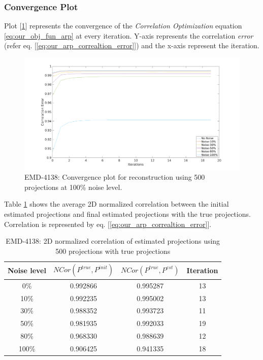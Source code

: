 \documentclass{report}
\begin{document}
\subsubsection{Convergence Plot}
Plot [\ref{figplot:emd_4138_result_Bm3d_convergence}] represents the convergence of the \textit{Correlation Optimization} equation \ref{eq:our_obj_fun_arp} at every iteration. Y-axis represents the correlation \textit{error} (refer eq. [\ref{eq:our_arp_correaltion_error}]) and the x-axis represent the iteration.

\begin{figure}[H]
\includegraphics[width=1\textwidth]{emd_4138_result_Bm3d_convergence.png}
\centering
\captionsetup{justification=centering}
\caption{EMD-4138: Convergence plot for reconstruction using 500 projections at 100\% noise level. }
\label{figplot:emd_4138_result_Bm3d_convergence}
\end{figure}

Table \ref{tbl:our_arp_4138_result-2d-correlation} shows the average 2D normalized correlation between the initial estimated projections and final estimated projections with the true projections. Correlation is represented by eq. [\ref{eq:our_arp_correaltion_error}]. 
\begin{table}[H]
    \centering
     \begin{tabular}{||c c c c ||} 
             \hline
             Noise level & $ NCor(P^{true},P^{init})$  &   $ NCor(P^{true},P^{est})$ &  Iteration \\
             \hline\hline
             0\% & 0.992866  & 0.995287 & 13 \\
            \hline
            10\% & 0.992235  & 0.995002 & 13 \\
            \hline
            30\% &0.988352  & 0.993723 & 11  \\
            \hline
            50\% &0.981935  & 0.992033 & 19 \\ 
            \hline
            80\% &0.968330  & 0.988639 & 12 \\
            \hline
            100\% &0.906425  & 0.941335 & 18 \\ [1ex]
            \hline
    \end{tabular}
    \caption{EMD-4138: 2D normalized correlation of estimated projections using 500 projections with true projections }
    \label{tbl:our_arp_4138_result-2d-correlation}
\end{table}
\end{document}
